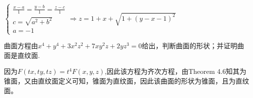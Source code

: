 \begin{solution}
    $\begin{cases}
        \frac{x-a}{1}=\frac{y-b}{1}=\frac{z-c}{1} \\
        c=\sqrt{a^2+b^2} \\
        a=-1
    \end{cases}
    \Rightarrow z=1+x+\sqrt{1+(y-x-1)^2}$
\end{solution}

\begin{problem}{}{}
    曲面方程由$x^4+y^4+3x^2z^2+7xy^2z+2yz^3=0$给出，判断曲面的形状；并证明曲面是直纹面.
\end{problem}

\begin{solution}
    因为$F(tx,ty,tz)=t^4F(x,y,z)$,因此该方程为齐次方程，由Theorem 4.6知其为锥面，又由直纹面定义可知，锥面为直纹面，因此该曲面的形状为锥面，且为直纹面。
\end{solution}